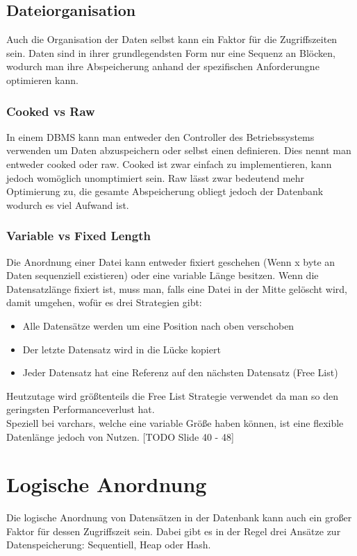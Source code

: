 \documentclass{article}
\begin{document}
	\subsection{Dateiorganisation}
	Auch die Organisation der Daten selbst kann ein Faktor für die Zugriffszeiten sein. Daten sind in ihrer grundlegendsten Form nur eine Sequenz an Blöcken, wodurch man ihre Abspeicherung anhand der spezifischen Anforderungne optimieren kann.
	\subsubsection{Cooked vs Raw}
	In einem DBMS kann man entweder den Controller des Betriebssystems verwenden um Daten abzuspeichern oder selbst einen definieren. Dies nennt man entweder cooked oder raw. Cooked ist zwar einfach zu implementieren, kann jedoch womöglich unomptimiert sein. Raw lässt zwar bedeutend mehr Optimierung zu, die gesamte Abspeicherung obliegt jedoch der Datenbank wodurch es viel Aufwand ist.
	\subsubsection{Variable vs Fixed Length}
	Die Anordnung einer Datei kann entweder fixiert geschehen (Wenn x byte an Daten sequenziell existieren) oder eine variable Länge besitzen. Wenn die Datensatzlänge fixiert ist, muss man, falls eine Datei in der Mitte gelöscht wird, damit umgehen, wofür es drei Strategien gibt:
	\begin{itemize}
		\item{Alle Datensätze werden um eine Position nach oben verschoben}
		\item{Der letzte Datensatz wird in die Lücke kopiert}
		\item{Jeder Datensatz hat eine Referenz auf den nächsten Datensatz (Free List)}
	\end{itemize}
	Heutzutage wird größtenteils die Free List Strategie verwendet da man so den geringsten Performanceverlust hat. \\
	Speziell bei varchars, welche eine variable Größe haben können, ist eine flexible Datenlänge jedoch von Nutzen. [TODO Slide 40 - 48]
	\section{Logische Anordnung}
	Die logische Anordnung von Datensätzen in der Datenbank kann auch ein großer Faktor für dessen Zugriffszeit sein. Dabei gibt es in der Regel drei Ansätze zur Datenspeicherung: Sequentiell, Heap oder Hash.
\end{document}
